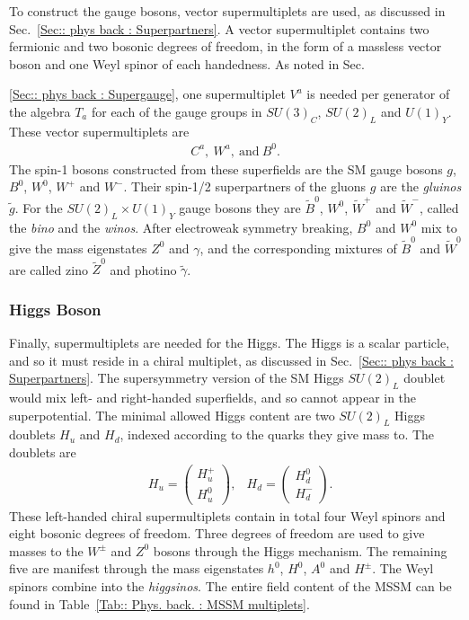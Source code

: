 \documentclass[twoside,english]{uiofysmaster}
\begin{document}
To construct the gauge bosons, vector supermultiplets are used, as discussed in Sec.~\ref{Sec:: phys back : Superpartners}. A vector supermultiplet contains two fermionic and two bosonic degrees of freedom, in the form of a massless vector boson and one Weyl spinor of each handedness. As noted in Sec.~{\ref{Sec:: phys back : Supergauge}, one supermultiplet $V^a$ is needed per generator of the algebra $T_a$ for each of the gauge groups in $SU(3)_C$, $SU(2)_L$ and $U(1)_Y$. These vector supermultiplets are
\begin{align}
C^a, ~W^a, ~\mathrm{and}~B^0.
\end{align}
The spin-1 bosons constructed from these superfields are the SM gauge bosons $g$, $B^0$, $W^0$, $W^+$ and $W^-$. Their spin-1/2 superpartners of the gluons $g$ are the \textit{gluinos} $\widetilde{g}$. For the $SU(2)_L \times U(1)_Y$ gauge bosons they are $\widetilde{B}^0$, $W^0$, $\widetilde{W}^+$ and $\widetilde{W}^-$, called the \textit{bino} and the \textit{winos}. After electroweak symmetry breaking, $B^0$ and $W^0$ mix to give the mass eigenstates $Z^0$ and $\gamma$, and the corresponding mixtures of $\widetilde{B}^0$ and $\widetilde{W}^0$ are called zino $\widetilde{Z}^0$ and photino $\widetilde{\gamma}$. 

\subsubsection{Higgs Boson}

Finally, supermultiplets are needed for the Higgs. The Higgs is a scalar particle, and so it must reside in a chiral multiplet, as discussed in Sec.~\ref{Sec:: phys back : Superpartners}. The supersymmetry version of the SM Higgs $SU(2)_L$ doublet would mix left- and right-handed superfields, and so cannot appear in the superpotential. The minimal allowed Higgs content are two $SU(2)_L$ Higgs doublets $H_u$ and $H_d$, indexed according to the quarks they give mass to. The doublets are
\begin{align}
&H_u = \begin{pmatrix}
H_u^+\\
H_u^0
\end{pmatrix},
&H_d = \begin{pmatrix}
H_d^0\\
H_d^-
\end{pmatrix}.
\end{align}
These left-handed chiral supermultiplets contain in total four Weyl spinors and eight bosonic degrees of freedom. Three degrees of freedom are used to give masses to the $W^{\pm}$ and $Z^0$ bosons through the Higgs mechanism. The remaining five are manifest through the mass eigenstates $h^0$, $H^0$, $A^0$ and $H^{\pm}$. The Weyl spinors combine into the \textit{higgsinos}. The entire field content of the MSSM can be found in Table~\ref{Tab:: Phys. back. : MSSM multiplets}.

}
\end{document}
